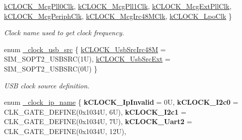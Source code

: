\begin{DoxyCompactItemize}
\mbox{\hyperlink{group__clock_gga10eb499a97d1bd20020841220bb5de74a8125faf928b40f13dee71966dd0a77c2}{k\+C\+L\+O\+C\+K\+\_\+\+Mcg\+Pll0\+Clk}}, 
\mbox{\hyperlink{group__clock_gga10eb499a97d1bd20020841220bb5de74aea90da9bfe47b3f46aed5662e8f34e93}{k\+C\+L\+O\+C\+K\+\_\+\+Mcg\+Pll1\+Clk}}, 
\newline
\mbox{\hyperlink{group__clock_gga10eb499a97d1bd20020841220bb5de74aff9fe6cca9e80cfdab21efda80da8e8b}{k\+C\+L\+O\+C\+K\+\_\+\+Mcg\+Ext\+Pll\+Clk}}, 
\mbox{\hyperlink{group__clock_gga10eb499a97d1bd20020841220bb5de74ad94ea13d2b1d9036d7d9e6303fc89c3a}{k\+C\+L\+O\+C\+K\+\_\+\+Mcg\+Periph\+Clk}}, 
\mbox{\hyperlink{group__clock_gga10eb499a97d1bd20020841220bb5de74a50c90dfd05fba07cff701a11c095f02a}{k\+C\+L\+O\+C\+K\+\_\+\+Mcg\+Irc48\+M\+Clk}}, 
\mbox{\hyperlink{group__clock_gga10eb499a97d1bd20020841220bb5de74a6a5c0cc2424bbbf2b73d76f51c16d438}{k\+C\+L\+O\+C\+K\+\_\+\+Lpo\+Clk}}
 \}
\begin{DoxyCompactList}\small\item\em Clock name used to get clock frequency. \end{DoxyCompactList}\item 
enum \mbox{\hyperlink{group__clock_ga9ebbef69e6c5fd52879fa79b3e607cf2}{\+\_\+clock\+\_\+usb\+\_\+src}} \{ \mbox{\hyperlink{group__clock_gga9ebbef69e6c5fd52879fa79b3e607cf2a042fc9c8cd8072258e23166ed0353ae9}{k\+C\+L\+O\+C\+K\+\_\+\+Usb\+Src\+Irc48M}} = S\+I\+M\+\_\+\+S\+O\+P\+T2\+\_\+\+U\+S\+B\+S\+RC(1U), 
\mbox{\hyperlink{group__clock_gga9ebbef69e6c5fd52879fa79b3e607cf2a4d65f0b3d0e477f16a84eecb6ad0d909}{k\+C\+L\+O\+C\+K\+\_\+\+Usb\+Src\+Ext}} = S\+I\+M\+\_\+\+S\+O\+P\+T2\+\_\+\+U\+S\+B\+S\+RC(0U)
 \}
\begin{DoxyCompactList}\small\item\em U\+SB clock source definition. \end{DoxyCompactList}\item 
\mbox{\label{group__clock_ga0d01cff2c331cdc2703b798930b1c9cd}} 
enum \mbox{\hyperlink{group__clock_ga0d01cff2c331cdc2703b798930b1c9cd}{\+\_\+clock\+\_\+ip\+\_\+name}} \{ \newline
{\bfseries k\+C\+L\+O\+C\+K\+\_\+\+Ip\+Invalid} = 0U, 
{\bfseries k\+C\+L\+O\+C\+K\+\_\+\+I2c0} = C\+L\+K\+\_\+\+G\+A\+T\+E\+\_\+\+D\+E\+F\+I\+NE(0x1034U, 6U), 
{\bfseries k\+C\+L\+O\+C\+K\+\_\+\+I2c1} = C\+L\+K\+\_\+\+G\+A\+T\+E\+\_\+\+D\+E\+F\+I\+NE(0x1034U, 7U), 
{\bfseries k\+C\+L\+O\+C\+K\+\_\+\+Uart2} = C\+L\+K\+\_\+\+G\+A\+T\+E\+\_\+\+D\+E\+F\+I\+NE(0x1034U, 12U), 
\newline

\end{DoxyCompactItemize}
